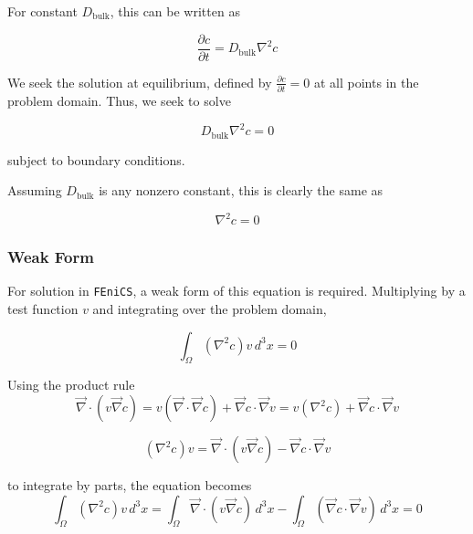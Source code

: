\documentclass{article}
\begin{document}
For constant $D_{\mathrm{bulk}}$, this can be written as

\begin{equation}
\frac{\partial c}{\partial t} = D_{\mathrm{bulk}} \nabla^2 c
\end{equation}

We seek the solution at equilibrium, defined by
$\frac{\partial c}{\partial t} = 0$ at all points in the problem domain.
Thus, we seek to solve

\begin{equation}
D_{\mathrm{bulk}} \nabla^2 c = 0
\end{equation}

subject to boundary conditions.

Assuming $D_{\mathrm{bulk}}$ is any nonzero constant, this is clearly the same as

\begin{equation}
\nabla^2 c = 0
\end{equation}

\subsubsection{Weak Form}\label{subsubsec:unhom_fick_weak}

For solution in \texttt{FEniCS}, a weak form of this equation is required.
Multiplying by a test function $v$ and integrating over the problem domain,

\begin{equation}
\int_{\Omega} \left(\nabla^2 c \right) v \,d^3x = 0
\end{equation}

Using the product rule
\begin{equation}
\vec{\nabla} \cdot \left( v \vec{\nabla} c \right) =
v \left(\vec{\nabla} \cdot \vec{\nabla} c \right) + \vec{\nabla}c \cdot \vec{\nabla}v =
v \left(\nabla^2 c \right) + \vec{\nabla}c \cdot \vec{\nabla}v
\end{equation}

\begin{equation}
\left(\nabla^2 c \right) v =
\vec{\nabla} \cdot \left( v \vec{\nabla} c \right) - \vec{\nabla}c \cdot \vec{\nabla}v
\end{equation}

to integrate by parts, the equation becomes
\begin{equation}
\int_{\Omega} \left(\nabla^2 c \right) v \,d^3x =
\int_{\Omega} \vec{\nabla} \cdot \left( v \vec{\nabla} c \right) \,d^3x
- \int_{\Omega} \left( \vec{\nabla}c \cdot \vec{\nabla}v \right) \,d^3x =0
\end{equation}
\end{document}
